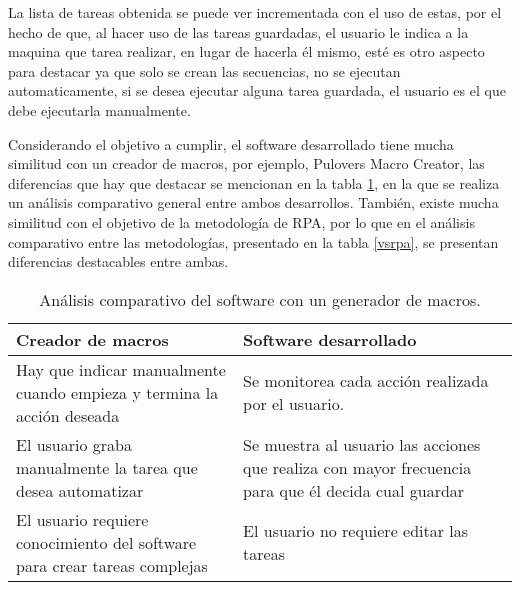 La lista de tareas obtenida se puede ver incrementada con el uso de estas, por 
 el hecho de que, al hacer uso de las tareas guardadas, el usuario le indica a 
 la maquina que tarea realizar, en lugar de hacerla \'el mismo, est\'e es otro 
 aspecto para destacar ya que solo se crean las secuencias, no se ejecutan 
 automaticamente, si se desea ejecutar alguna tarea guardada, el usuario es el 
 que debe ejecutarla manualmente.


Considerando el objetivo a cumplir, el software desarrollado tiene mucha 
 similitud con un creador de macros, por 
 ejemplo, Pulovers Macro Creator, las diferencias que hay que destacar se 
 mencionan en la tabla \ref{vsmacros}, en la que se realiza un an\'alisis 
 comparativo general entre ambos desarrollos. Tambi\'en, existe mucha 
 similitud con el objetivo de la metodolog\'ia de RPA, 
 por lo que en el an\'alisis 
 comparativo entre las metodolog\'ias, presentado en la tabla \ref{vsrpa}, se 
 presentan diferencias destacables entre ambas.
 

\begin{table}[h]
\centering
\begin{tabular}{m{6cm}|m{6cm}}
\hline
\textbf{Creador de macros} 	&	\textbf{Software desarrollado} \\
\hline
Hay que indicar manualmente cuando empieza y termina la acci\'on deseada	
 &	
Se monitorea cada acci\'on realizada por el usuario.\\
\hline

El usuario graba manualmente la tarea que desea automatizar	
 &
Se muestra al usuario las acciones que realiza con mayor frecuencia para que
  \'el decida cual guardar\\
\hline

El usuario requiere conocimiento del software para crear tareas complejas 	
 &
El usuario no requiere editar las tareas\\
\hline
\end{tabular}
\caption{An\'alisis comparativo del software con un generador de macros.}
\label{vsmacros}
\end{table}


